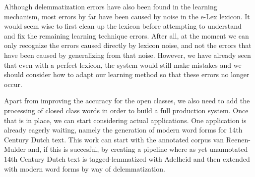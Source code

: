 \documentclass[a4paper,10pt,twoside]{article}
\begin{document}
Although delemmatization errors have also been found in the learning mechanism, most errors by far have been caused by noise in the e-Lex lexicon. It would seem wise to first clean up the lexicon before attempting to understand and fix the remaining learning technique errors. After all, at the moment we can only recognize the errors caused directly by lexicon noise, and not the errors that have been caused by generalizing from that noise. However, we have already seen that even with a perfect lexicon, the system would still make mistakes and we should consider how to adapt our learning method so that these errors no longer occur.

Apart from improving the accuracy for the open classes, we also need to add the processing of closed class words in order to build a full production system. Once that is in place, we can start considering actual applications. One application is already eagerly waiting, namely the generation of modern word forms for 14th Century Dutch text. This work can start with the annotated corpus van Reenen-Mulder \cite{REFcrm} and, if this is succesful, by creating a pipeline where as yet unannotated 14th Century Dutch text is tagged-lemmatized with Adelheid \cite{REFadelheid} and then extended with  modern word forms by way of delemmatization.





\end{document}
